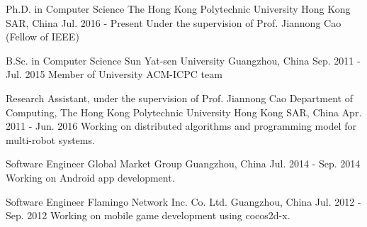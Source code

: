 \documentclass[11pt, a4paper]{awesome-cv} %
\begin{document}
\makecvheader %

\begin{cventries}
\cventry
{Ph.D. in Computer Science} %
{The Hong Kong Polytechnic University} %
{Hong Kong SAR, China} %
{Jul. 2016 - Present} %
{ %
Under the supervision of Prof. Jiannong Cao (Fellow of IEEE)
}

\cventry
{B.Sc. in Computer Science} %
{Sun Yat-sen University} %
{Guangzhou, China} %
{Sep. 2011 - Jul. 2015} %
{ %
Member of University ACM-ICPC team
}
\end{cventries}

\begin{cventries}
\cventry
{Research Assistant, under the supervision of Prof. Jiannong Cao} %
{Department of Computing, The Hong Kong Polytechnic University} %
{Hong Kong SAR, China} %
{Apr. 2011 - Jun. 2016} %
{ %
Working on distributed algorithms and programming model for multi-robot systems.
}

\cventry
{Software Engineer} %
{Global Market Group} %
{Guangzhou, China} %
{Jul. 2014 - Sep. 2014} %
{ %
Working on Android app development.
}

\cventry
{Software Engineer} %
{Flamingo Network Inc. Co. Ltd.} %
{Guangzhou, China} %
{Jul. 2012 - Sep. 2012} %
{ %
Working on mobile game development using cocos2d-x.
}
\end{cventries}
\end{document}
